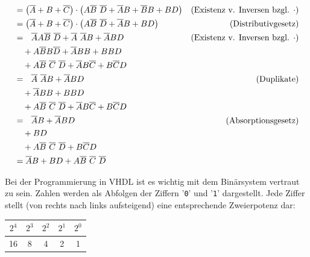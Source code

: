 \documentclass[a4paper,12pt]{article}
\begin{document}
{\begin{enumerate}
\begin{align*}
 &=  \left( \overline{A} +B +\overline{C} \right) \cdot \left( A\overline{B}~\overline{D} +\overline{A}B +\overline{B}B +BD \right) & \text{(Existenz v. Inversen bzgl. $\cdot$)} \nonumber \\
 &=  \left( \overline{A} +B +\overline{C} \right) \cdot \left( A\overline{B}~\overline{D} +\overline{A}B +BD \right) & \text{(Distributivgesetz)} \nonumber \\
 &=\,\,\,\, \overline{A}A\overline{B}~\overline{D} +\overline{A}~\overline{A}B +\overline{A}BD & \text{(Existenz v. Inversen bzgl. $\cdot$)} \nonumber \\
 &\quad+A\overline{B}B\overline{D} +\overline{A}BB +BBD \nonumber \\
 &\quad+A\overline{B}~\overline{C}~\overline{D} +\overline{A}B\overline{C} +B\overline{C}D \nonumber \\
 &=\,\,\,\, \overline{A}~\overline{A}B +\overline{A}BD & \text{(Duplikate)} \nonumber \\
 &\quad +\overline{A}BB +BBD \nonumber \\
 &\quad+A\overline{B}~\overline{C}~\overline{D} +\overline{A}B\overline{C} +B\overline{C}D \nonumber \\
 &=\,\,\,\, \overline{A}B +\overline{A}BD & \text{(Absorptionsgesetz)} \nonumber \\
 &\quad  +BD \nonumber \\
 &\quad+A\overline{B}~\overline{C}~\overline{D}  +B\overline{C}D \nonumber \\
  &= \overline{A}B +BD +A\overline{B}~\overline{C}~\overline{D} \nonumber
\end{align*}
\end{enumerate}

}{}








 Bei der Programmierung in VHDL
ist es wichtig mit dem Binärsystem vertraut zu sein. Zahlen werden als
Abfolgen der Ziffern '\texttt{0}' und '\texttt{1}' dargestellt. Jede
Ziffer stellt (von rechts nach links aufsteigend) eine entsprechende
Zweierpotenz dar:

\begin{center}
  \begin{tabular}{|c|c|c|c|c|}
    \hline{}
    $2^4$&$2^3$&$2^2$&$2^1$&$2^0$\\
    \hline{}
    16&8&4&2&1\\\hline
  \end{tabular}
\end{center}
\end{document}
